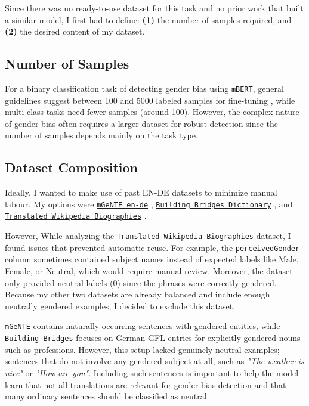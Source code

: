 Since there was no ready-to-use dataset for this task and no prior work that built a similar model, I first had to define: \textbf{(1)} the number of samples required,  and \textbf{(2)} the desired content of my dataset.

\subsection{Number of Samples}
For a binary classification task of detecting gender bias using \texttt{mBERT}, general guidelines suggest between 100 and 5000 labeled samples for fine-tuning \parencite{pecherComparingSpecialisedSmall2024}, while multi-class tasks need fewer samples (around 100). However, the complex nature of gender bias often requires a larger dataset for robust detection since the number of samples depends mainly on the task type. 

\subsection{Dataset Composition}
Ideally, I wanted to make use of past EN-DE datasets to minimize manual labour. My options were \texttt{\href{https://huggingface.co/datasets/FBK-MT/mGeNTE}{mGeNTE en-de}} \parencite{savoldiMGeNTEMultilingualResource2025}, \texttt{\href{https://github.com/g8a9/building-bridges-gender-fair-german-mt}{Building Bridges Dictionary}} \parencite{lardelliBuildingBridgesDataset2024}, and \texttt{\href{https://research.google/blog/a-dataset-for-studying-gender-bias-in-translation/}{Translated Wikipedia Biographies}} \parencite{stellaDatasetStudyingGender2021}. 

However, While analyzing the \texttt{Translated Wikipedia Biographies} dataset, I found issues that prevented automatic reuse. For example, the \texttt{perceivedGender} column sometimes contained subject names instead of expected labels like Male, Female, or Neutral, which would require manual review. Moreover, the dataset only provided neutral labels (0) since the phrases were correctly gendered. Because my other two datasets are already balanced and include enough neutrally gendered examples, I decided to exclude this dataset.

\texttt{mGeNTE} contains naturally occurring sentences with gendered entities, while \texttt{Building Bridges} focuses on German GFL entries for explicitly gendered nouns such as professions. However, this setup lacked genuinely neutral examples; sentences that do not involve any gendered subject at all, such as \textit{"The weather is nice"} or \textit{"How are you"}. Including such sentences is important to help the model learn that not all translations are relevant for gender bias detection and that many ordinary sentences should be classified as neutral.

